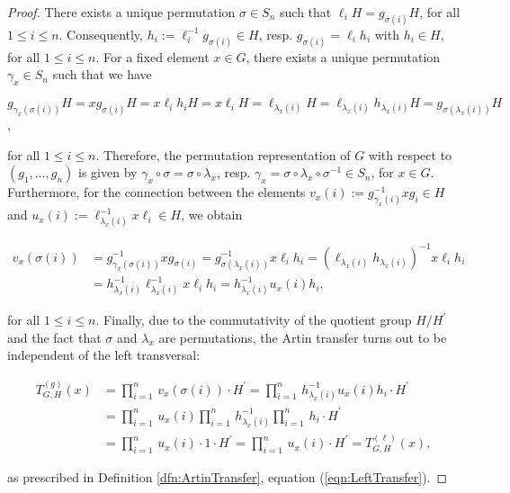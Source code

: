 \documentclass{amsart}
\theoremstyle{definition}
\numberwithin{equation}{section}
\begin{document}
\begin{proof}
There exists a unique permutation \(\sigma\in S_n\) such that \(\ell_iH=g_{\sigma(i)}H\), for all \(1\le i\le n\).
Consequently, \(h_i:=\ell_i^{-1}g_{\sigma(i)}\in H\), resp. \(g_{\sigma(i)}=\ell_ih_i\) with \(h_i\in H\),
for all \(1\le i\le n\).
For a fixed element \(x\in G\), there exists a unique permutation \(\gamma_x\in S_n\) such that we have

\begin{center}
\(g_{\gamma_x(\sigma(i))}H=xg_{\sigma(i)}H=x\ell_ih_iH=x\ell_iH
=\ell_{\lambda_x(i)}H=\ell_{\lambda_x(i)}h_{\lambda_x(i)}H=g_{\sigma(\lambda_x(i))}H\),
\end{center}

\noindent
for all \(1\le i\le n\).
Therefore, the permutation representation of \(G\) with respect to \((g_1,\ldots,g_n)\) is given by
\(\gamma_x\circ\sigma=\sigma\circ\lambda_x\), resp. \(\gamma_x=\sigma\circ\lambda_x\circ\sigma^{-1}\in S_n\),
for \(x\in G\).
Furthermore, for the connection between the elements
\(v_x(i):=g_{\gamma_x(i)}^{-1}xg_i\in H\) and \(u_x(i):=\ell_{\lambda_x(i)}^{-1}x\ell_i\in H\), we obtain

\begin{align*}
v_x(\sigma(i)) &= g_{\gamma_x(\sigma(i))}^{-1}xg_{\sigma(i)}
=g_{\sigma(\lambda_x(i))}^{-1}x\ell_ih_i=(\ell_{\lambda_x(i)}h_{\lambda_x(i)})^{-1}x\ell_ih_i\\
               &= h_{\lambda_x(i)}^{-1}\ell_{\lambda_x(i)}^{-1}x\ell_ih_i=h_{\lambda_x(i)}^{-1}u_x(i)h_i,
\end{align*}

\noindent
for all \(1\le i\le n\).
Finally, due to the commutativity of the quotient group \(H/H^\prime\)
and the fact that \(\sigma\) and \(\lambda_x\) are permutations,
the Artin transfer turns out to be independent of the left transversal: 

\begin{align*}
T_{G,H}^{(g)}(x) &= \prod_{i=1}^n\,v_x(\sigma(i))\cdot H^\prime
=\prod_{i=1}^n\,h_{\lambda_x(i)}^{-1}u_x(i)h_i\cdot H^\prime\\
                    &= \prod_{i=1}^n\,u_x(i)\prod_{i=1}^n\,h_{\lambda_x(i)}^{-1}\prod_{i=1}^n\,h_i\cdot H^\prime\\
                    &= \prod_{i=1}^n\,u_x(i)\cdot 1\cdot H^\prime=\prod_{i=1}^n\,u_x(i)\cdot H^\prime
=T_{G,H}^{(\ell)}(x),
\end{align*}

\noindent
as prescribed in Definition
\ref{dfn:ArtinTransfer},
equation
(\ref{eqn:LeftTransfer}).
\end{proof}
\end{document}
